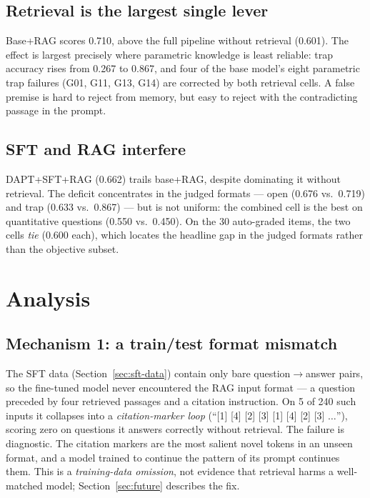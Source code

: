 \documentclass[11pt]{article}
\begin{document}
\subsection{Retrieval is the largest single lever}

Base+RAG scores 0.710, above the full pipeline without retrieval
(0.601). The effect is largest precisely where parametric knowledge is
least reliable: trap accuracy rises from 0.267 to 0.867, and four of
the base model's eight parametric trap failures (G01, G11, G13, G14)
are corrected by both retrieval cells. A false premise is hard to
reject from memory, but easy to reject with the contradicting passage
in the prompt.

\subsection{SFT and RAG interfere}

DAPT+SFT+RAG (0.662) trails base+RAG, despite dominating it without
retrieval. The deficit concentrates in the judged formats --- open
(0.676 vs.\ 0.719) and trap (0.633 vs.\ 0.867) --- but is not uniform:
the combined cell is the best on quantitative questions (0.550 vs.\
0.450). On the 30 auto-graded items, the two cells \emph{tie} (0.600
each), which locates the headline gap in the judged formats rather
than the objective subset.

\section{Analysis}
\label{sec:analysis}

\subsection{Mechanism 1: a train/test format mismatch}

The SFT data (Section~\ref{sec:sft-data}) contain only bare
question$\rightarrow$answer pairs, so the fine-tuned model never
encountered the RAG input format --- a question preceded by four
retrieved passages and a citation instruction. On 5 of 240 such inputs
it collapses into a \emph{citation-marker loop} (``[1] [4] [2] [3] [1]
[4] [2] [3] $\ldots$''), scoring zero on questions it answers correctly
without retrieval. The failure is diagnostic. The citation markers are
the most salient novel tokens in an unseen format, and a model trained
to continue the pattern of its prompt continues them. This is a
\emph{training-data omission}, not evidence that retrieval harms a
well-matched model; Section~\ref{sec:future} describes the fix.
\end{document}
